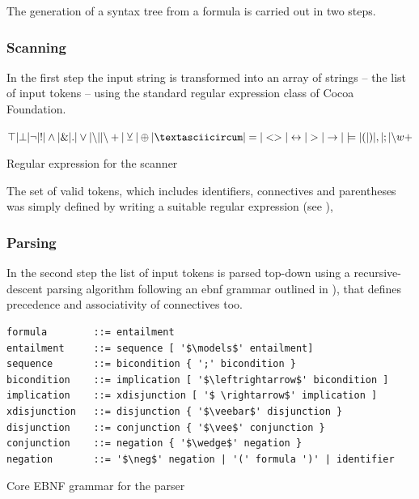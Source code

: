 The generation of a syntax tree from a formula  is carried out in two steps. 

\subsubsection{Scanning}


In the first step the input string is transformed into an array of strings – the list of input tokens –
using the standard regular expression class of Cocoa Foundation.
\begin{table}[htdp]
\begin{center}
$\top | \bot 
| \neg | !
| \wedge | \& | .
| \vee | {\setminus}| | {\setminus}+ 
| \veebar | \oplus | \textasciicircum
| = | <> | \leftrightarrow 
| > | \rightarrow | \models
| ( | ) | , | ; 
| {\setminus}w+$ 
\caption{Regular expression for the scanner}
\label{tab:REGEX}
\end{center}
\end{table}

The set of valid tokens, which includes identifiers, connectives and parentheses
was simply defined by writing a suitable regular expression (see ), 

\subsubsection{Parsing}

In the second step the list of input tokens is parsed top-down 
using a recursive-descent parsing algorithm \cite[p.144ff]{Louden:1997:CCP:523017} 
following an ebnf grammar outlined in ), 
that defines precedence and associativity of connectives too.

\begin{table}[htdp]
\begin{center}
\begin{lstlisting}[mathescape]
formula        ::= entailment
entailment     ::= sequence [ '$\models$' entailment]
sequence       ::= bicondition { ';' bicondition } 
bicondition    ::= implication [ '$\leftrightarrow$' bicondition ]
implication    ::= xdisjunction [ '$ \rightarrow$' implication ]
xdisjunction   ::= disjunction { '$\veebar$' disjunction }
disjunction    ::= conjunction { '$\vee$' conjunction }
conjunction    ::= negation { '$\wedge$' negation }
negation       ::= '$\neg$' negation | '(' formula ')' | identifier
\end{lstlisting}
\caption{Core EBNF grammar for the parser}
\label{tab:CoreEBNF}
\end{center}
\end{table}

